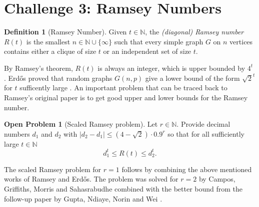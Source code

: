 \documentclass[12pt]{article}
\numberwithin{equation}{section}
\theoremstyle{definition}
\newtheorem{definition}{Definition}
\newtheorem{openproblem}[theorem]{Open Problem}
\begin{document}
\section*{Challenge 3: Ramsey Numbers}

\begin{definition}[Ramsey Number]
Given $t\in \mathbb{N}$, the \emph{(diagonal) Ramsey number} \( R(t) \) is the smallest $n\in \mathbb{N}\cup \{\infty\}$ such that every simple graph \( G \) on \( n \) vertices contains either a clique of size \( t \) or an independent set of size \( t \).
\end{definition}
By Ramsey's theorem, $R(t)$ is always an integer, which is upper bounded by $4^t$ \cite{ramsey1930formal, ramseygraham1990ramsey}.
Erd\H{o}s proved that random graphs $G(n,p)$ give a lower bound of the form $\sqrt{2}^t$ for $t$ sufficently large \cite{erdos1947some}. An important problem  that can be traced back to Ramsey's original paper \cite{ramsey1930formal} is to get good upper and lower bounds for the Ramsey number.

\begin{openproblem}[Scaled Ramsey problem]
Let $r\in \mathbb{N}$.
Provide decimal numbers $d_1$ and $d_2$ with $|d_2-d_1|\leq (4-\sqrt{2}) \cdot 0.9^r$ so that for all sufficiently large $t\in \mathbb{N}$
\[
d_1^t \leq R(t) \leq d_2^t.
\]
\end{openproblem}

The scaled Ramsey problem for $r=1$ follows by combining the above mentioned works of Ramsey and Erd\H{o}s.
The problem was solved for $r=2$ by Campos, Griffiths, Morris  and Sahasrabudhe
\cite{campos2026exponential} combined with the better bound from the follow-up paper by 
Gupta, Ndiaye, Norin and Wei \cite{gupta2024optimizing}.

\printbibliography
\end{document}
